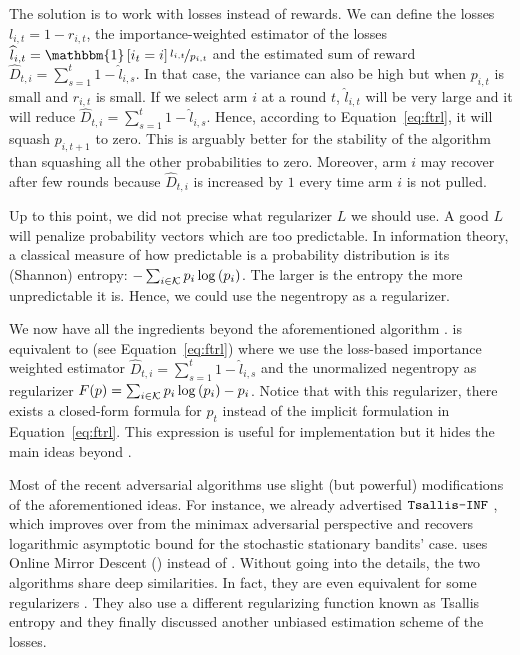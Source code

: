 {The solution is to work with losses instead of rewards. We can define the losses $l_{i,t} = 1 - r_{i,t}$, the importance-weighted estimator of the losses $\hat{l}_{i,t}  = \mathbbm{1}\left[i_t =i \right] \nicefrac{l_{i,t}}{p_{i,t}}$ and the estimated sum of reward $\hat{D}_{t,i} = \sum_{s=1}^t 1 - \hat{l}_{i,s}$. In that case, the variance can also be high but when $p_{i,t}$ is small and $r_{i,t}$ is small. If we select arm $i$ at a round $t$, $\hat{l}_{i,t}$ will be very large and it will reduce $\hat{D}_{t,i} = \sum_{s=1}^t 1 - \hat{l}_{i,s}$. Hence, according to Equation~\ref{eq:ftrl}, it will squash $p_{i,t+1}$ to zero. This is arguably better for the stability of the algorithm than squashing all the other probabilities to zero. Moreover, arm $i$ may recover after few rounds because $\hat{D}_{t,i}$ is increased by $1$ every time arm $i$ is not pulled. 

Up to this point, we did not precise what regularizer $L$ we should use. A good $L$ will penalize probability vectors which are too predictable. In information theory, a classical measure of how predictable is a probability distribution is its (Shannon) entropy: $- \sum_{i \in \mathcal{K}} p_i \log\left(p_i\right)$. The larger is the entropy the more unpredictable it is. Hence, we could use the negentropy as a regularizer. 

We now have all the ingredients beyond the aforementioned \EXP algorithm \citep{auer2002nonstochastic}. \EXP is equivalent to \FTRL (see Equation~\ref{eq:ftrl}) where we use the loss-based importance weighted estimator $\hat{D}_{t,i} = \sum_{s=1}^t 1 - \hat{l}_{i,s}$ and the unormalized negentropy as regularizer $F(p) = \sum_{i \in \mathcal{K}} p_i \log\left(p_i\right) - p_i$. Notice that with this regularizer, there exists a closed-form formula for $p_t$ instead of the implicit formulation in Equation~\ref{eq:ftrl}. This expression is useful for implementation but it hides the main ideas beyond \EXP.

Most of the recent adversarial algorithms use slight (but powerful) modifications of the aforementioned ideas. For instance, we already advertised $\texttt{Tsallis-INF}$ \citep{zimmert2018tsallis}, which improves over \EXP from the minimax adversarial perspective and recovers logarithmic asymptotic bound for the stochastic stationary bandits' case. \TsallisINF uses Online Mirror Descent (\OMD) instead of \FTRL. Without going into the details, the two algorithms share deep similarities. In fact, they are even equivalent for some regularizers \citep{mcmahan2011ftrl}. They also use a different regularizing function known as Tsallis entropy \citep{tsallis1988possible} and they finally discussed another unbiased estimation scheme of the losses.

}
